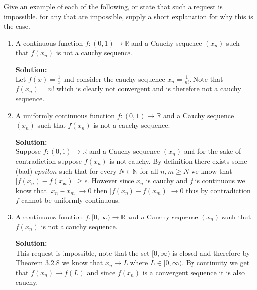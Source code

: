 \documentclass[12pt]{article}
\makeatletter
\theoremstyle{homework}
\newenvironment{exercise}[1]
{\def\@currentlabel{#1}\exercisecore}
{\endexercisecore}
\newcommand{\localhead}[1]{\par\smallskip\noindent\textbf{#1}\nobreak\\}%
\newcommand\solution{\localhead{Solution:}}
\newcommand{\Reals}{\ensuremath{\mathbb R}}
\newcommand{\Nats}{\ensuremath{\mathbb N}}
\makeatother
\begin{document}
\begin{exercise}{Abbott 4.4.6} Give an example of each of the following, or state that such a request is impossible.
  for any that are impossible, supply a short explanation for why this is the case.\\

  \begin{enumerate}
    \item A continuous function $f: (0,1) \to \Reals$ and a Cauchy sequence $(x_n)$ such that $f(x_n)$ is not a cauchy sequence.\\
    \solution Let $f(x) = \frac{1}{x}$ and consider the cauchy sequence $x_n =\frac{1}{n!}$. Note that $f(x_n) = n!$ which is clearly not convergent and is therefore not a cauchy sequence. 
    \vspace{.25in}

    \item A uniformly continuous function $f: (0,1) \to \Reals$ and a Cauchy sequence $(x_n)$ such that $f(x_n)$ is not a cauchy sequence.\\
    \solution Suppose $f: (0,1) \to \Reals$ and a Cauchy sequence $(x_n)$ and for the sake of contradiction suppose $f(x_n)$ is not cauchy. By definition there exists some
    (bad) $epsilon$ such that for every $N \in \Nats$ for all $n,m \geq N$ we know that $|f(x_n) - f(x_m)| \geq \epsilon$. However since $x_n$ is cauchy and $f$ is continuous we know that 
    $|x_n - x_m| \to 0$ then $|f(x_n) - f(x_m)| \to 0$ thus by contradiction $f$ cannot be uniformly continuous.
    \vspace{.25in}

    \item A continuous function $f: [0,\infty) \to \Reals$ and a Cauchy sequence $(x_n)$ such that $f(x_n)$ is not a cauchy sequence.\\
    \solution This request is impossible, note that the set $[0,\infty)$ is closed and therefore by Theorem 3.2.8 we know that $x_n \to L$ where $L \in [0,\infty)$.
    By continuity we get that $f(x_n) \to f(L)$ and since $f(x_n)$ is a convergent sequence it is also cauchy. 
  \end{enumerate}
\end{exercise} 
\vspace{.5in}
\end{document}
